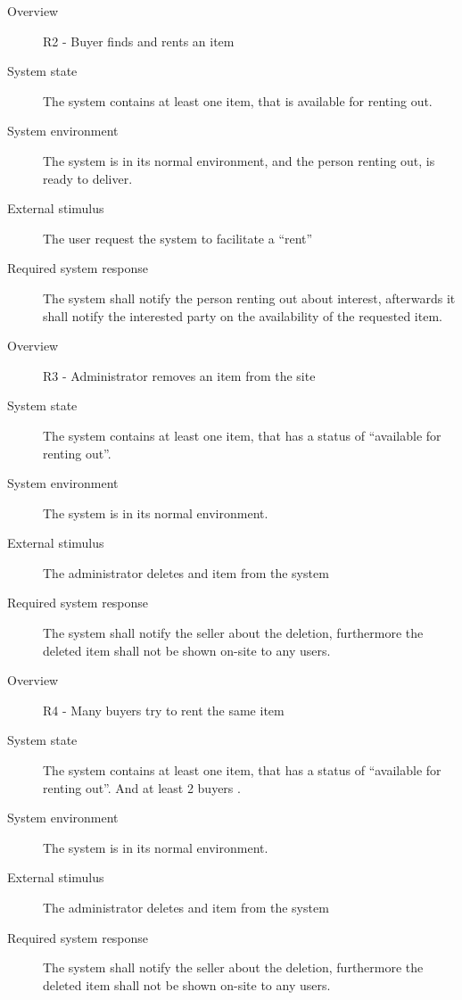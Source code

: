 \documentclass[a4paper,11pt]{report}
\newcommand{\seller}{ seller }
\newcommand{\buyers}{ buyers }
\newcommand{\Buyer}{ Buyer }
\begin{document}
\begin{description}
    \item[Overview] R2 - \Buyer finds and rents an item
    \item[System state] The system contains at least one item, that is
        available for renting out.
    \item[System environment] The system is in its normal environment, and the
        person renting out, is ready to deliver.
    \item[External stimulus] The user request the system to facilitate a
        ``rent''
    \item[Required system response] The system shall notify the person renting
        out about interest, afterwards it shall notify the interested party on
        the availability of the requested item.
\end{description}

\begin{description}
    \item[Overview] R3 - Administrator removes an item from the site
    \item[System state] The system contains at least one item, that has a
        status of ``available for renting out''.
    \item[System environment] The system is in its normal environment.
    \item[External stimulus] The administrator deletes and item from the system 
    \item[Required system response] The system shall notify the \seller about
        the deletion, furthermore the deleted item shall not be shown on-site
        to any users.
\end{description}

\begin{description}
    \item[Overview] R4 - Many \buyers try to rent the same item
    \item[System state] The system contains at least one item, that has a
        status of ``available for renting out''. And at least 2 \buyers.
    \item[System environment] The system is in its normal environment.
    \item[External stimulus] The administrator deletes and item from the system 
    \item[Required system response] The system shall notify the \seller about
        the deletion, furthermore the deleted item shall not be shown on-site
        to any users.
\end{description}
\end{document}
